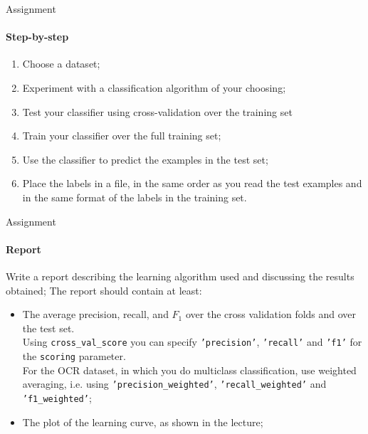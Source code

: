 \documentclass{beamer}
\begin{document}
\begin{frame}{Assignment}
\framesubtitle{Step-by-step}

\begin{enumerate}
\item Choose a dataset;
\item Experiment with a classification algorithm of your choosing;
\item Test your classifier using cross-validation over the training set
\item Train your classifier over the full training set;
\item Use the classifier to predict the examples in the test set;
\item Place the labels in a file, in the same order as you read the test
      examples and in the same format of the labels in the training set.
\end{enumerate}

\end{frame}

\begin{frame}{Assignment}
\framesubtitle{Report}

Write a report describing the learning algorithm used and discussing the
results obtained; The report should contain at least:
    \begin{itemize}
    \item The average precision, recall, and $F_1$ over the cross validation folds
	    and over the test set. \\ Using
          \texttt{cross\_val\_score} you can specify \texttt{'precision'},
          \texttt{'recall'} and \texttt{'f1'} for the \texttt{scoring}
          parameter. \\ For the OCR dataset, in which you do multiclass
          classification, use weighted averaging, i.e. using
          \texttt{'precision\_weighted'}, \texttt{'recall\_weighted'} and
          \texttt{'f1\_weighted'}; 
    \item The plot of the learning curve, as shown in the lecture;
    \end{itemize}

\end{frame}
\end{document}
